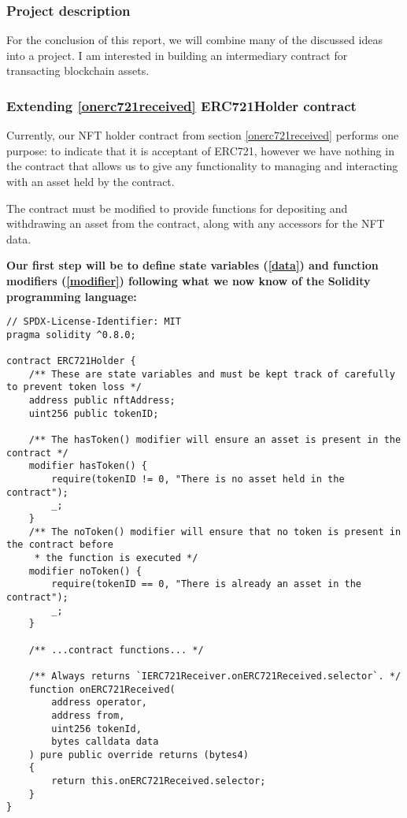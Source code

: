 \documentclass{article}
\theoremstyle{theorem}
\theoremstyle{definition}
\theoremstyle{remark}
\begin{document}
\subsubsection{Project description}
For the conclusion of this report, we will combine many of the discussed ideas into a project. I am interested in building an intermediary contract for transacting blockchain assets.


\subsubsection{Extending \ref{onerc721received} ERC721Holder contract} \label{erc721holder}

Currently, our NFT holder contract from section \ref{onerc721received} performs one purpose: to indicate that it is acceptant of ERC721, however we have nothing in the contract that allows us to give any functionality to managing and interacting with an asset held by the contract.

\medskip\noindent
The contract must be modified to provide functions for depositing and withdrawing an asset from the contract, along with any accessors for the NFT data.

\medskip\noindent
\begin{itemize}
\textbf{Our first step will be to define state variables (\ref{data}) and function modifiers (\ref{modifier}) following what we now know of the Solidity programming language:}

\begin{lstlisting}
// SPDX-License-Identifier: MIT
pragma solidity ^0.8.0;

contract ERC721Holder {
    /** These are state variables and must be kept track of carefully to prevent token loss */
    address public nftAddress;
    uint256 public tokenID;
    
    /** The hasToken() modifier will ensure an asset is present in the contract */
    modifier hasToken() {
        require(tokenID != 0, "There is no asset held in the contract");
        _;
    }
    /** The noToken() modifier will ensure that no token is present in the contract before 
     * the function is executed */
    modifier noToken() {
        require(tokenID == 0, "There is already an asset in the contract");
        _;
    }
    
    /** ...contract functions... */

    /** Always returns `IERC721Receiver.onERC721Received.selector`. */
    function onERC721Received( 
        address operator, 
        address from, 
        uint256 tokenId, 
        bytes calldata data 
    ) pure public override returns (bytes4) 
    {
        return this.onERC721Received.selector;
    }
}
\end{lstlisting}
\end{itemize}
\end{document}
